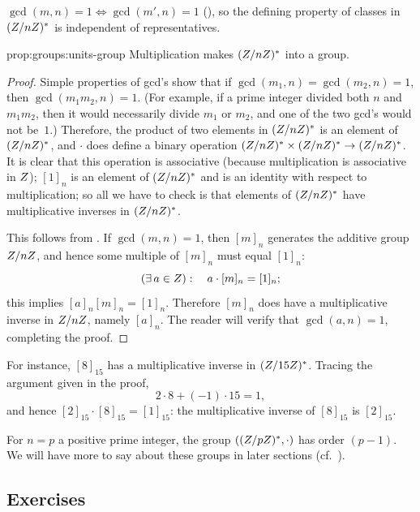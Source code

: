 $\gcd(m,n)=1 \iff \gcd(m',n)=1$
(), so the defining
property of classes in $(Z/nZ)^*$ is independent of representatives.
\begin{prop}{}{prop:groups:units-group}
  Multiplication makes $(Z/nZ)^*$ into a group.
\end{prop}
\begin{proof}
  Simple properties of gcd's show that if
  $\gcd(m_1,n) = \gcd(m_2,n) = 1$, then $\gcd(m_1 m_2, n) = 1$. (For
  example, if a prime integer divided both $n$ and $m_1 m_2$, then it
  would necessarily divide $m_1$ or $m_2$, and one of the two gcd's
  would not be~$1$.) Therefore, the product of two elements in
  $(Z/nZ)^*$ is an element of $(Z/nZ)^*$, and $\cdot$ does define
  a binary operation $(Z/nZ)^* \times (Z/nZ)^* \to (Z/nZ)^*$. It
  is clear that this operation is associative (because multiplication
  is associative in $Z$); $[1]_n$ is an element of $(Z/nZ)^*$ and
  is an identity with respect to multiplication; so all we have to
  check is that elements of $(Z/nZ)^*$ have multiplicative inverses
  in $(Z/nZ)^*$.

  This follows from . If
  $\gcd(m,n) = 1$, then $[m]_n$ generates the additive group $Z/nZ$,
  and hence some multiple of $[m]_n$ must equal $[1]_n$:
  \[
    (\exists\, a \in Z) : \quad a \cdot [m]_n = [1]_n;
  \]
  this implies $[a]_n [m]_n = [1]_n$. Therefore $[m]_n$ does have a
  multiplicative inverse in $Z/nZ$, namely $[a]_n$. The reader will
  verify that $\gcd(a,n)=1$, completing the proof.
\end{proof}

For instance, $[8]_{15}$ has a multiplicative inverse in
$(Z/15Z)^*$. Tracing the argument given in the proof,
\[
  2 \cdot 8 + (-1) \cdot 15 = 1,
\]
and hence $[2]_{15} \cdot [8]_{15} = [1]_{15}$: the multiplicative
inverse of $[8]_{15}$ is $[2]_{15}$.

For $n = p$ a positive prime integer, the group $((Z/pZ)^*, \cdot)$
has order $(p-1)$. We will have more to say about these groups in
later sections (cf.\ ).

\subsection*{Exercises}

